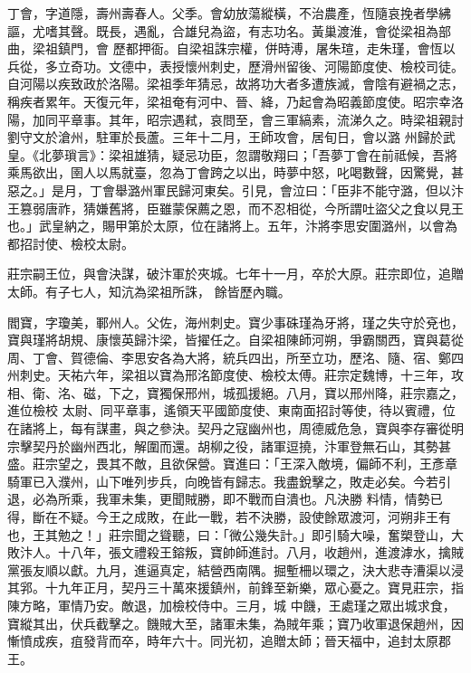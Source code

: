 
\begin{pinyinscope}

 丁會，字道隱，壽州壽春人。父季。會幼放蕩縱橫，不治農產，恆隨哀挽者學紼謳，尤嗜其聲。既長，遇亂，合雄兒為盜，有志功名。黃巢渡淮，會從梁祖為部曲，梁祖鎮門，會
 歷都押衙。自梁祖誅宗權，併時溥，屠朱瑄，走朱瑾，會恆以兵從，多立奇功。文德中，表授懷州刺史，歷滑州留後、河陽節度使、檢校司徒。自河陽以疾致政於洛陽。梁祖季年猜忌，故將功大者多遭族滅，會陰有避禍之志，稱疾者累年。天復元年，梁祖奄有河中、晉、絳，乃起會為昭義節度使。昭宗幸洛陽，加同平章事。其年，昭宗遇弒，哀問至，會三軍縞素，流涕久之。時梁祖親討劉守文於滄州，駐軍於長蘆。三年十二月，王師攻會，居旬日，會以潞
 州歸於武皇。《北夢瑣言》：梁祖雄猜，疑忌功臣，忽謂敬翔曰；「吾夢丁會在前祗候，吾將乘馬欲出，圉人以馬就臺，忽為丁會跨之以出，時夢中怒，叱喝數聲，因驚覺，甚惡之。」是月，丁會舉潞州軍民歸河東矣。引見，會泣曰：「臣非不能守潞，但以汴王篡弱唐祚，猜嫌舊將，臣雖蒙保薦之恩，而不忍相從，今所謂吐盜父之食以見王也。」武皇納之，賜甲第於太原，位在諸將上。五年，汴將李思安圍潞州，以會為都招討使、檢校太尉。



 莊宗嗣王位，與會決謀，破汴軍於夾城。七年十一月，卒於大原。莊宗即位，追贈太師。有子七人，知沆為梁祖所誅，
 餘皆歷內職。



 閻寶，字瓊美，鄆州人。父佐，海州刺史。寶少事硃瑾為牙將，瑾之失守於兗也，寶與瑾將胡規、康懷英歸汴梁，皆擢任之。自梁祖陳師河朔，爭霸關西，寶與葛從周、丁會、賀德倫、李思安各為大將，統兵四出，所至立功，歷洺、隨、宿、鄭四州刺史。天祐六年，梁祖以寶為邢洺節度使、檢校太傅。莊宗定魏博，十三年，攻相、衛、洺、磁，下之，寶獨保邢州，城孤援絕。八月，寶以邢州降，莊宗嘉之，進位檢校
 太尉、同平章事，遙領天平國節度使、東南面招討等使，待以賓禮，位在諸將上，每有謀畫，與之參決。契丹之寇幽州也，周德威危急，寶與李存審從明宗擊契丹於幽州西北，解圍而還。胡柳之役，諸軍逗撓，汴軍登無石山，其勢甚盛。莊宗望之，畏其不敵，且欲保營。寶進曰：「王深入敵境，偏師不利，王彥章騎軍已入濮州，山下唯列步兵，向晚皆有歸志。我盡銳擊之，敗走必矣。今若引退，必為所乘，我軍未集，更聞賊勝，即不戰而自潰也。凡決勝
 料情，情勢已得，斷在不疑。今王之成敗，在此一戰，若不決勝，設使餘眾渡河，河朔非王有也，王其勉之！」莊宗聞之聳聽，曰：「微公幾失計。」即引騎大噪，奮槊登山，大敗汴人。十八年，張文禮殺王鎔叛，寶帥師進討。八月，收趙州，進渡滹水，擒賊黨張友順以獻。九月，進逼真定，結營西南隅。掘塹柵以環之，決大悲寺漕渠以浸其郛。十九年正月，契丹三十萬來援鎮州，前鋒至新樂，眾心憂之。寶見莊宗，指陳方略，軍情乃安。敵退，加檢校侍中。三月，城
 中饑，王處瑾之眾出城求食，寶縱其出，伏兵截擊之。饑賊大至，諸軍未集，為賊年乘；寶乃收軍退保趙州，因慚憤成疾，疽發背而卒，時年六十。同光初，追贈太師；晉天福中，追封太原郡王。




\end{pinyinscope}
